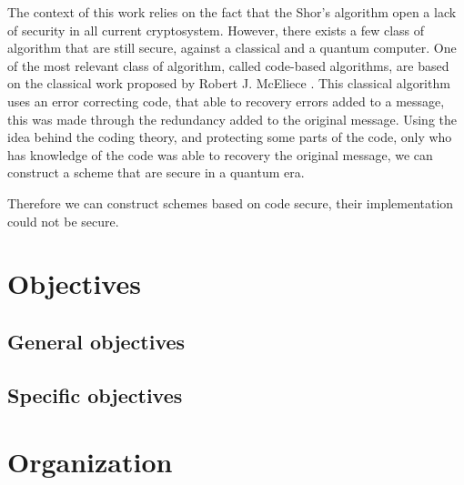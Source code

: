 The context of this work relies on the fact that the Shor's algorithm open a lack of security in all current cryptosystem. However, there exists a few class of algorithm that are still secure, against a classical and a quantum computer. One of the most relevant class of algorithm, called code-based algorithms, are based on the classical work proposed by Robert J. McEliece \cite{mceliece1978public}. This classical algorithm uses an error correcting code, that able to recovery errors added to a message, this was made through the redundancy added to the original message. Using the idea behind the coding theory, and protecting some parts of the code, only who has knowledge of the code was able to recovery the original message, we can construct a scheme that are secure in a quantum era.

Therefore we can construct schemes based on code secure, their implementation could not be secure. 
\section{Objectives}
\subsection{General objectives}
\subsection{Specific objectives}
\section{Organization}
